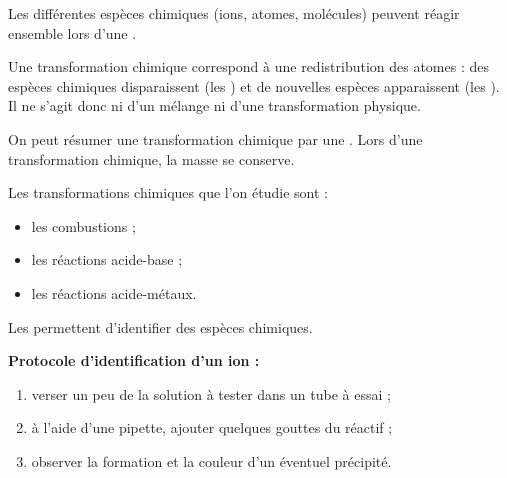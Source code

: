 \documentclass[11pt,a4paper]{article}
\begin{document}
\vspace*{-0.5em}


Les différentes espèces chimiques (ions, atomes, molécules) peuvent réagir
ensemble lors d'une .

Une transformation chimique correspond à une redistribution des atomes : des
espèces chimiques disparaissent (les ) et de nouvelles
espèces apparaissent (les ). Il ne s'agit donc ni d'un
mélange ni d'une transformation physique.


On peut résumer une transformation chimique par une . Lors d'une transformation chimique, la masse se conserve.

Les transformations chimiques que l'on étudie sont :
\begin{itemize}
    \item les combustions ;
    \item les réactions acide-base ;
    \item les réactions acide-métaux.
\end{itemize}


\vspace*{-0.5em}

Les  permettent d'identifier des espèces
chimiques.

\textbf{Protocole d'identification d'un ion :}
\begin{enumerate}
    \item verser un peu de la solution à tester dans un tube à essai ;
    \item à l'aide d'une pipette, ajouter quelques gouttes du réactif ;
    \item observer la formation et la couleur d'un éventuel précipité.
\end{enumerate}
\end{document}
